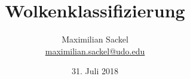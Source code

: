 

\subject{Machine Learning for Physicists}
\title{Wolkenklassifizierung}

\author{%
  Maximilian Sackel\\%
  \href{mailto:maximilian.sackel@udo.edu}{maximilian.sackel@udo.edu}%
}
\date{%
  31. Juli 2018
}



\maketitle
\thispagestyle{empty}
\tableofcontents
\newpage
\nocite{keras}








\printbibliography{}



